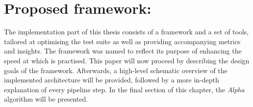 
\chapter{Proposed framework: \velocity{}}
\label{ch:velocity}
The implementation part of this thesis consists of a framework and a set of tools, tailored at optimising the test suite as well as providing accompanying metrics and insights. The framework was named \emph{\velocity{}} to reflect its purpose of enhancing the speed at which \CI{} is practised. This paper will now proceed by describing the design goals of the framework. Afterwards, a high-level schematic overview of the implemented architecture will be provided, followed by a more in-depth explanation of every pipeline step. In the final section of this chapter, the \emph{Alpha} algorithm will be presented.




